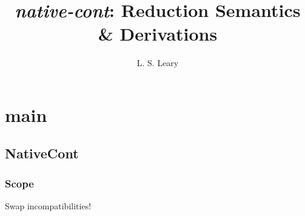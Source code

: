 \documentclass{report}
\title{\emph{native-cont}: Reduction Semantics \& Derivations}
\author{L. S. Leary}
\begin{document}
\maketitle
\tableofcontents

\chapter{main} %

\section{NativeCont} %

\subsection{Scope} %

Swap incompatibilities!
\end{document}
